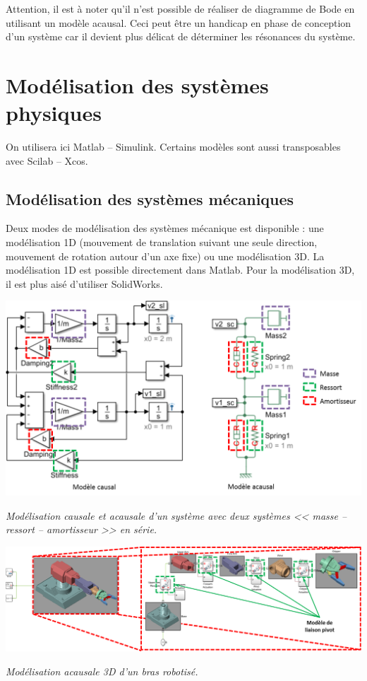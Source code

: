 \documentclass[10pt,fleqn]{article} %
\begin{document}
\begin{warn}
Attention, il est à noter qu'il n'est possible de réaliser de diagramme de Bode en utilisant un modèle acausal. Ceci peut être un handicap en phase de conception d'un système car il devient plus délicat de déterminer les résonances du système.
\end{warn}
\section{Modélisation des systèmes physiques}
On utilisera ici Matlab -- Simulink. Certains modèles sont aussi transposables avec Scilab -- Xcos. 

\subsection{Modélisation des systèmes mécaniques}
Deux modes de modélisation des systèmes mécanique est disponible : une modélisation 1D (mouvement de translation suivant une seule direction, mouvement de rotation autour d'un axe fixe) ou une modélisation 3D. 
La modélisation 1D est possible directement dans Matlab. Pour la modélisation 3D, il est plus aisé d'utiliser SolidWorks. 

\begin{center}
\includegraphics[width=.6\linewidth]{images/Masse_Ressort}

\textit{Modélisation causale et acausale d'un système avec deux systèmes << masse -- ressort -- amortisseur >> en série.}
\end{center}

\begin{center}
\includegraphics[width=.9\linewidth]{images/Modele3D}

\textit{Modélisation acausale 3D d'un bras robotisé.}
\end{center}
\end{document}
